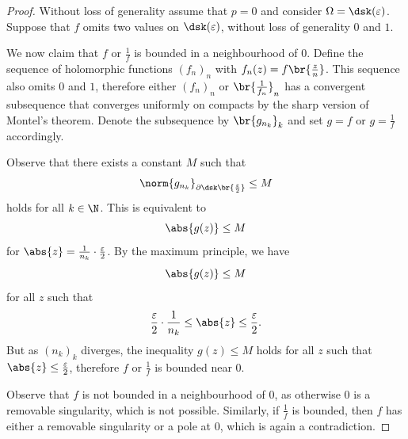 \begin{proof}
Without loss of generality assume that $p = 0$ and consider
$\Omega = \dsk(\varepsilon)$. Suppose that $f$ omits two values on
$\dsk(\varepsilon)$, without loss of generality $0$ and $1$.

We now claim that $f$ or $\frac{1}{f}$ is bounded in a
neighbourhood of $0$. Define the sequence of holomorphic functions
$(f_n)_n$ with $f_n(z) = f \br{\frac{z}{n}}$. This sequence also
omits $0$ and $1$, therefore either $(f_n)_n$ or
$\br{\frac{1}{f_n}}_n$ has a convergent subsequence that converges
uniformly on compacts by the sharp version of Montel's theorem.
Denote the subsequence by $\br{g_{n_k}}_k$ and set $g = f$ or
$g = \frac{1}{f}$ accordingly.

Observe that there exists a constant $M$ such that
\[
\norm{g_{n_k}}_{\partial \dsk \br{\frac{\varepsilon}{2}}} \leq M
\]
holds for all $k \in \N$. This is equivalent to
\[
\abs{g(z)} \leq M
\]
for $\abs{z} = \frac{1}{n_k} \cdot \frac{\varepsilon}{2}$. By the
maximum principle, we have
\[
\abs{g(z)} \leq M
\]
for all $z$ such that
\[
\frac{\varepsilon}{2} \cdot \frac{1}{n_k} \leq
\abs{z} \leq
\frac{\varepsilon}{2}.
\]
But as $(n_k)_k$ diverges, the inequality $g(z) \leq M$ holds for
all $z$ such that $\abs{z} \leq \frac{\varepsilon}{2}$, therefore
$f$ or $\frac{1}{f}$ is bounded near $0$.

Observe that $f$ is not bounded in a neighbourhood of $0$, as
otherwise $0$ is a removable singularity, which is not possible.
Similarly, if $\frac{1}{f}$ is bounded, then $f$ has either a
removable singularity or a pole at $0$, which is again a
contradiction.
\end{proof}
